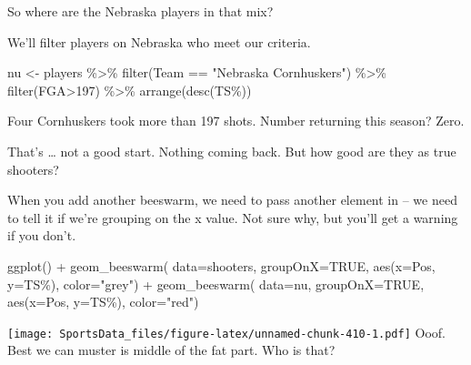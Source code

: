 \documentclass[
]{book}
\newenvironment{Shaded}{\begin{snugshade}}{\end{snugshade}}
\newcommand{\AttributeTok}[1]{\textcolor[rgb]{0.77,0.63,0.00}{#1}}
\newcommand{\ConstantTok}[1]{\textcolor[rgb]{0.00,0.00,0.00}{#1}}
\newcommand{\DecValTok}[1]{\textcolor[rgb]{0.00,0.00,0.81}{#1}}
\newcommand{\FunctionTok}[1]{\textcolor[rgb]{0.00,0.00,0.00}{#1}}
\newcommand{\NormalTok}[1]{#1}
\newcommand{\OtherTok}[1]{\textcolor[rgb]{0.56,0.35,0.01}{#1}}
\newcommand{\SpecialCharTok}[1]{\textcolor[rgb]{0.00,0.00,0.00}{#1}}
\newcommand{\StringTok}[1]{\textcolor[rgb]{0.31,0.60,0.02}{#1}}
\begin{document}
So where are the Nebraska players in that mix?

We'll filter players on Nebraska who meet our criteria.

\begin{Shaded}
\begin{Highlighting}[]
\NormalTok{nu }\OtherTok{\textless{}{-}}\NormalTok{ players }\SpecialCharTok{\%\textgreater{}\%} 
  \FunctionTok{filter}\NormalTok{(Team }\SpecialCharTok{==} \StringTok{"Nebraska Cornhuskers"}\NormalTok{) }\SpecialCharTok{\%\textgreater{}\%} 
  \FunctionTok{filter}\NormalTok{(FGA}\SpecialCharTok{\textgreater{}}\DecValTok{197}\NormalTok{) }\SpecialCharTok{\%\textgreater{}\%} 
  \FunctionTok{arrange}\NormalTok{(}\FunctionTok{desc}\NormalTok{(}\StringTok{\textasciigrave{}}\AttributeTok{TS\%}\StringTok{\textasciigrave{}}\NormalTok{))}
\end{Highlighting}
\end{Shaded}

Four Cornhuskers took more than 197 shots. Number returning this season? Zero.

That's \ldots{} not a good start. Nothing coming back. But how good are they as true shooters?

When you add another beeswarm, we need to pass another element in -- we need to tell it if we're grouping on the x value. Not sure why, but you'll get a warning if you don't.

\begin{Shaded}
\begin{Highlighting}[]
\FunctionTok{ggplot}\NormalTok{() }\SpecialCharTok{+} 
  \FunctionTok{geom\_beeswarm}\NormalTok{(}
    \AttributeTok{data=}\NormalTok{shooters, }
    \AttributeTok{groupOnX=}\ConstantTok{TRUE}\NormalTok{, }
    \FunctionTok{aes}\NormalTok{(}\AttributeTok{x=}\NormalTok{Pos, }\AttributeTok{y=}\StringTok{\textasciigrave{}}\AttributeTok{TS\%}\StringTok{\textasciigrave{}}\NormalTok{), }\AttributeTok{color=}\StringTok{"grey"}\NormalTok{) }\SpecialCharTok{+} 
  \FunctionTok{geom\_beeswarm}\NormalTok{(}
    \AttributeTok{data=}\NormalTok{nu, }
    \AttributeTok{groupOnX=}\ConstantTok{TRUE}\NormalTok{, }
    \FunctionTok{aes}\NormalTok{(}\AttributeTok{x=}\NormalTok{Pos, }\AttributeTok{y=}\StringTok{\textasciigrave{}}\AttributeTok{TS\%}\StringTok{\textasciigrave{}}\NormalTok{), }\AttributeTok{color=}\StringTok{"red"}\NormalTok{)}
\end{Highlighting}
\end{Shaded}

\texttt{[image: SportsData\_files/figure-latex/unnamed-chunk-410-1.pdf]}
Ooof. Best we can muster is middle of the fat part. Who is that?
\end{document}
